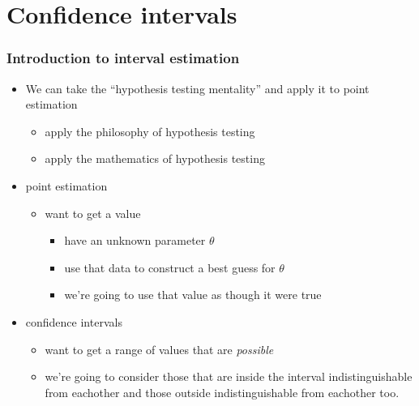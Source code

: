 

\part*{Confidence intervals}%

\section{Introduction to interval estimation}

\begin{itemize}
\item We can take the ``hypothesis testing mentality'' and apply it to
      point estimation
\begin{itemize}
\item apply the philosophy of hypothesis testing
\item apply the mathematics of hypothesis testing
\end{itemize}
\item point estimation
\begin{itemize}
\item want to get a value
\begin{itemize}
\item have an unknown parameter $θ$
\item use that data to construct a best guess for $θ$
\item we're going to use that value as though it were true
\end{itemize}
\end{itemize}
\item confidence intervals
\begin{itemize}
\item want to get a range of values that are \emph{possible}
\item we're going to consider those that are inside the interval
        indistinguishable from eachother and those outside
        indistinguishable from eachother too.
\end{itemize}
\end{itemize}


